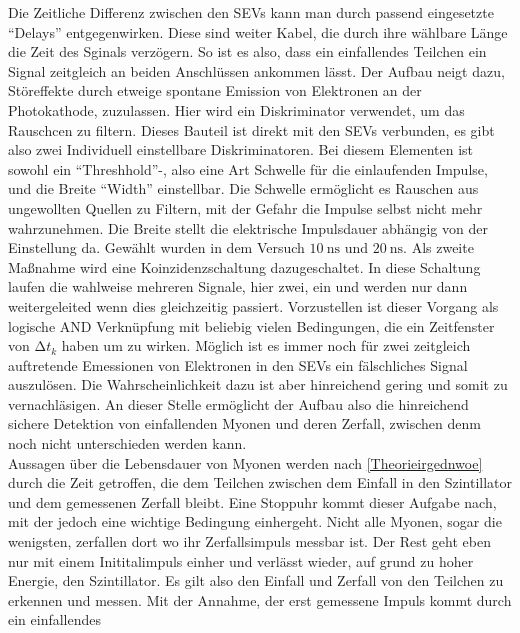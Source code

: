 \vspace{0.5cm}
Die Zeitliche Differenz zwischen den SEVs kann man durch passend eingesetzte \enquote{Delays} entgegenwirken. Diese sind weiter Kabel, 
die durch ihre wählbare Länge die Zeit des Sginals verzögern. So ist es also, dass ein einfallendes Teilchen ein Signal zeitgleich an beiden Anschlüssen ankommen lässt.
Der Aufbau neigt dazu, Störeffekte durch etweige spontane Emission von Elektronen an der Photokathode, zuzulassen. Hier wird ein Diskriminator verwendet, um das Rauschcen zu filtern.
Dieses Bauteil ist direkt mit den SEVs verbunden, es gibt also zwei Individuell einstellbare Diskriminatoren. Bei diesem Elementen ist sowohl
ein \enquote{Threshhold}-, also eine Art Schwelle für die einlaufenden Impulse, und die Breite \enquote{Width} einstellbar.
Die Schwelle ermöglicht es Rauschen aus ungewollten Quellen zu Filtern, mit der Gefahr die Impulse selbst nicht mehr wahrzunehmen. 
Die Breite stellt die elektrische Impulsdauer abhängig von der Einstellung da. Gewählt wurden in dem Versuch $\SI{10}{\nano\second}$ und $\SI{20}{\nano\second}$.
Als zweite Maßnahme wird eine Koinzidenzschaltung dazugeschaltet. In diese Schaltung laufen die wahlweise mehreren Signale, hier zwei, ein und werden nur dann weitergeleited wenn dies gleichzeitig passiert.
Vorzustellen ist dieser Vorgang als logische AND Verknüpfung mit beliebig vielen Bedingungen, die ein Zeitfenster von $\increment t_k$ haben um zu wirken. 
Möglich ist es immer noch für zwei zeitgleich auftretende Emessionen von Elektronen in den SEVs ein fälschliches Signal auszulösen. Die Wahrscheinlichkeit dazu ist aber hinreichend gering
und somit zu vernachläsigen. An dieser Stelle ermöglicht der Aufbau also die hinreichend sichere Detektion von einfallenden Myonen und deren Zerfall, zwischen denm noch nicht unterschieden werden kann. 
\\
\newline
Aussagen über die Lebensdauer von Myonen werden nach \ref{Theorieirgednwoe} durch die Zeit getroffen, die dem Teilchen zwischen dem Einfall in den Szintillator und dem gemessenen 
Zerfall bleibt. Eine Stoppuhr kommt dieser Aufgabe nach, mit der jedoch eine wichtige Bedingung einhergeht. 
Nicht alle Myonen, sogar die wenigsten, zerfallen dort wo ihr Zerfallsimpuls messbar ist. Der Rest geht eben nur mit einem Inititalimpuls einher und verlässt wieder, auf grund zu hoher Energie, den Szintillator.
Es gilt also den Einfall und Zerfall von den Teilchen zu erkennen und messen. Mit der Annahme, der erst gemessene Impuls kommt durch ein einfallendes 
